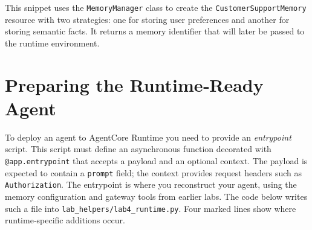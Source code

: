 This snippet uses the \texttt{MemoryManager} class to create the
\texttt{CustomerSupportMemory} resource with two strategies: one for
storing user preferences and another for storing semantic facts.  It
returns a memory identifier that will later be passed to the runtime
environment.

\section{Preparing the Runtime‑Ready Agent}

To deploy an agent to AgentCore Runtime you need to provide an
\emph{entrypoint} script.  This script must define an asynchronous
function decorated with \texttt{@app.entrypoint} that accepts a
payload and an optional context.  The payload is expected to contain a
\texttt{prompt} field; the context provides request headers such as
\texttt{Authorization}.  The entrypoint is where you reconstruct your
agent, using the memory configuration and gateway tools from earlier
labs.  The code below writes such a file into
\texttt{lab\_helpers/lab4\_runtime.py}.  Four marked lines show where
runtime‑specific additions occur.

